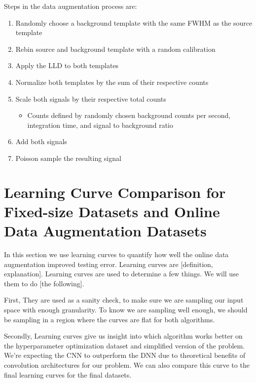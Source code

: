 Steps in the data augmentation process are:
\begin{enumerate}
  \item Randomly choose a background template with the same FWHM as the source template
  \item Rebin source and background template with a random calibration
  \item Apply the LLD to both templates
  \item Normalize both templates by the sum of their respective counts 
  \item Scale both signals by their respective total counts
  \begin{itemize}
     \item Counts defined by randomly chosen background counts per second, integration time, and signal to background ratio
   \end{itemize}
  \item Add both signals 
  \item Poisson sample the resulting signal
\end{enumerate}


\section{Learning Curve Comparison for Fixed-size Datasets and Online Data Augmentation Datasets}

In this section we use learning curves to quantify how well the online data augmentation improved testing error. Learning curves are [definition, explanation]. Learning curves are used to determine a few things. We will use them to do [the following].

First, They are used as a sanity check, to make sure we are sampling our input space with enough granularity. To know we are sampling well enough, we should be sampling in a region where the curves are flat for both algorithms.

Secondly, Learning curves give us insight into which algorithm works better on the hyperparameter optimization dataset and simplified version of the problem. We're expecting the CNN to outperform the DNN due to theoretical benefits of convolution architectures for our problem. We can also compare this curve to the final learning curves for the final datasets.


